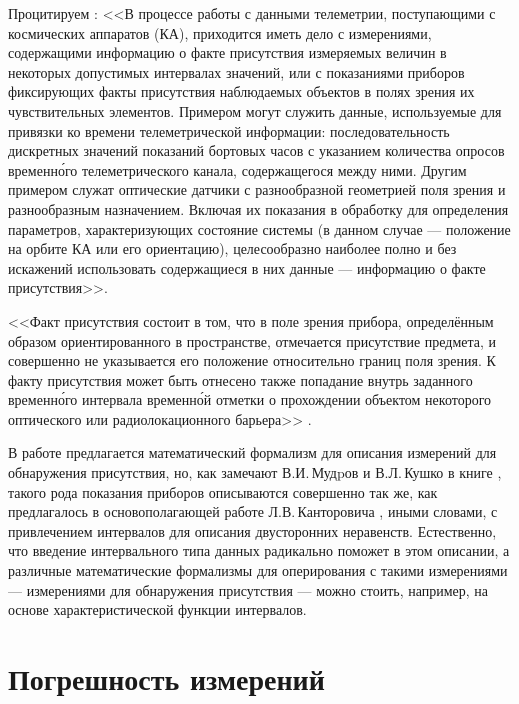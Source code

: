 \documentclass[a5paper,openany]{book}
\begin{document}
Процитируем \cite{Khatskevich}: <<В процессе работы с данными телеметрии, 
поступающими с космических аппаратов (КА), приходится иметь дело с измерениями, 
содержащими информацию о факте присутствия измеряемых величин в некоторых 
допустимых интервалах значений, или с показаниями приборов фиксирующих факты 
присутствия наблюдаемых объектов в полях зрения их чувствительных элементов. 
Примером могут служить данные, используемые для привязки ко времени телеметрической 
информации: последовательность дискретных значений показаний бортовых часов 
с указанием количества опросов временн\'{о}го телеметрического канала, содержащегося 
между ними. Другим примером служат оптические датчики с разнообразной геометрией 
поля зрения и разнообразным назначением. Включая их показания в обработку 
для определения параметров, характеризующих состояние системы (в данном случае 
--- положение на орбите КА или его ориентацию), целесообразно наиболее полно и 
без искажений использовать содержащиеся в них данные --- информацию о факте 
присутствия>>.   
    
<<Факт присутствия состоит в том, что в поле зрения прибора, определённым образом 
ориентированного в пространстве, отмечается присутствие предмета, и совершенно 
не указывается его положение относительно границ поля зрения. К факту присутствия 
может быть отнесено также попадание внутрь заданного временн\'{о}го интервала 
временн\'{о}й отметки о прохождении объектом некоторого оптического или 
радиолокационного барьера>>  \cite{MudrovKushko}.  
  
В работе \cite{Khatskevich} предлагается математический формализм для описания 
измерений для обнаружения присутствия, но, как замечают В.И.\,Мудpов и В.Л.\,Кушко 
в книге \cite{MudrovKushko}, такого рода показания приборов описываются 
совершенно так же, как предлагалось в основополагающей работе Л.В.\,Канторовича 
\cite{Kantorovich}, иными словами, с привлечением интервалов для описания 
двусторонних неравенств. Естественно, что введение интервального типа данных 
радикально поможет в этом описании, а различные математические формализмы 
для оперирования с такими измерениями --- измерениями для обнаружения 
присутствия --- можно стоить, например, на основе характеристической 
функции интервалов. 
    
  
\section{Погрешность измерений} 
  
\end{document}

